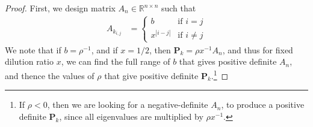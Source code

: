 \documentclass[11pt, letterpaper]{article}
\newcommand{\mbb}[1]{\mathbb{#1}}
\begin{document}
\begin{proof}
First, we design matrix $A_n \in \mbb R ^{n\times n}$ such that 
\begin{align*}
A_{k_{i,j}}  &= \begin{cases}
b & \text{if } i = j \\
x ^{|i-j|} & \text{if } i \neq j 
\end{cases} 
\end{align*} 
We note that if $b = \rho ^{-1}$, and if $x = 1/2$, then $\bm P_k = \rho x^{-1} A_n$, and thus for fixed dilution ratio $x$, we can find the full range of $b$ that gives positive definite $A_n$, and thence the values of $\rho$ that give positive definite $\bm P_k$.\footnote{If $\rho < 0$, then we are looking for a negative-definite $A_n$, to produce a positive definite $\bm P_k$, since all eigenvalues are multiplied by $\rho x^{-1}$. }



\end{proof}
\end{document}
